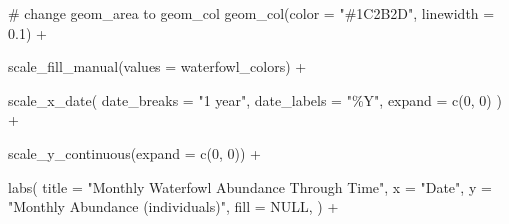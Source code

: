 \documentclass[
  letterpaper,
  DIV=11,
  numbers=noendperiod]{scrartcl}
\newenvironment{Shaded}{\begin{snugshade}}{\end{snugshade}}
\newcommand{\AttributeTok}[1]{\textcolor[rgb]{0.40,0.45,0.13}{#1}}
\newcommand{\CommentTok}[1]{\textcolor[rgb]{0.37,0.37,0.37}{#1}}
\newcommand{\ConstantTok}[1]{\textcolor[rgb]{0.56,0.35,0.01}{#1}}
\newcommand{\DecValTok}[1]{\textcolor[rgb]{0.68,0.00,0.00}{#1}}
\newcommand{\FloatTok}[1]{\textcolor[rgb]{0.68,0.00,0.00}{#1}}
\newcommand{\FunctionTok}[1]{\textcolor[rgb]{0.28,0.35,0.67}{#1}}
\newcommand{\NormalTok}[1]{\textcolor[rgb]{0.00,0.23,0.31}{#1}}
\newcommand{\SpecialCharTok}[1]{\textcolor[rgb]{0.37,0.37,0.37}{#1}}
\newcommand{\StringTok}[1]{\textcolor[rgb]{0.13,0.47,0.30}{#1}}
\begin{document}
\begin{Shaded}
\begin{Highlighting}[]
  \CommentTok{\# change geom\_area to geom\_col}
  \FunctionTok{geom\_col}\NormalTok{(}\AttributeTok{color =} \StringTok{"\#1C2B2D"}\NormalTok{, }\AttributeTok{linewidth =} \FloatTok{0.1}\NormalTok{) }\SpecialCharTok{+}

  \FunctionTok{scale\_fill\_manual}\NormalTok{(}\AttributeTok{values =}\NormalTok{ waterfowl\_colors) }\SpecialCharTok{+}

  \FunctionTok{scale\_x\_date}\NormalTok{(}
    \AttributeTok{date\_breaks =} \StringTok{"1 year"}\NormalTok{,}
    \AttributeTok{date\_labels =} \StringTok{"\%Y"}\NormalTok{,}
    \AttributeTok{expand =} \FunctionTok{c}\NormalTok{(}\DecValTok{0}\NormalTok{, }\DecValTok{0}\NormalTok{)}
\NormalTok{  ) }\SpecialCharTok{+}

  \FunctionTok{scale\_y\_continuous}\NormalTok{(}\AttributeTok{expand =} \FunctionTok{c}\NormalTok{(}\DecValTok{0}\NormalTok{, }\DecValTok{0}\NormalTok{)) }\SpecialCharTok{+}

  \FunctionTok{labs}\NormalTok{(}
    \AttributeTok{title =} \StringTok{"Monthly Waterfowl Abundance Through Time"}\NormalTok{,}
    \AttributeTok{x     =} \StringTok{"Date"}\NormalTok{,}
    \AttributeTok{y     =} \StringTok{"Monthly Abundance (individuals)"}\NormalTok{,}
    \AttributeTok{fill  =} \ConstantTok{NULL}\NormalTok{,}
\NormalTok{  ) }\SpecialCharTok{+}


\end{Highlighting}
\end{Shaded}
\end{document}
